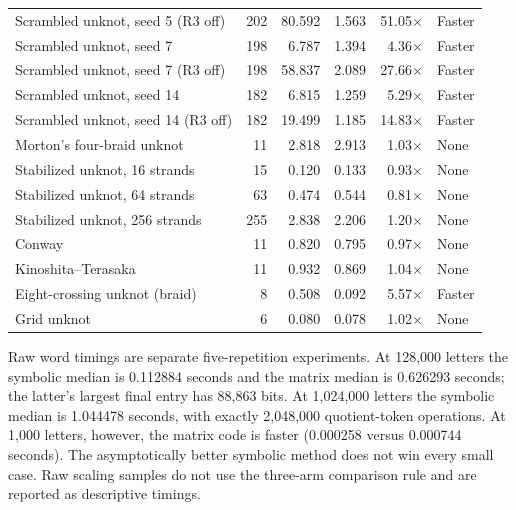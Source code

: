 \begin{longtable}{@{}p{}rrrrl@{}}
Scrambled unknot, seed 5 (R3 off) & 202 & 80.592 & 1.563 & 51.05\(\times\) & Faster \\
Scrambled unknot, seed 7 & 198 & 6.787 & 1.394 & 4.36\(\times\) & Faster \\
Scrambled unknot, seed 7 (R3 off) & 198 & 58.837 & 2.089 & 27.66\(\times\) & Faster \\
Scrambled unknot, seed 14 & 182 & 6.815 & 1.259 & 5.29\(\times\) & Faster \\
Scrambled unknot, seed 14 (R3 off) & 182 & 19.499 & 1.185 & 14.83\(\times\) & Faster \\
Morton's four-braid unknot & 11 & 2.818 & 2.913 & 1.03\(\times\) & None \\
Stabilized unknot, 16 strands & 15 & 0.120 & 0.133 & 0.93\(\times\) & None \\
Stabilized unknot, 64 strands & 63 & 0.474 & 0.544 & 0.81\(\times\) & None \\
Stabilized unknot, 256 strands & 255 & 2.838 & 2.206 & 1.20\(\times\) & None \\
Conway & 11 & 0.820 & 0.795 & 0.97\(\times\) & None \\
Kinoshita--Terasaka & 11 & 0.932 & 0.869 & 1.04\(\times\) & None \\
Eight-crossing unknot (braid) & 8 & 0.508 & 0.092 & 5.57\(\times\) & Faster \\
Grid unknot & 6 & 0.080 & 0.078 & 1.02\(\times\) & None \\
\end{longtable}
\endgroup

Raw word timings are separate five-repetition experiments. At 128,000
letters the symbolic median is 0.112884 seconds and the matrix median
is 0.626293 seconds; the latter's largest final entry has 88,863 bits.
At 1,024,000 letters the symbolic median is 1.044478 seconds, with exactly
2,048,000 quotient-token operations. At 1,000 letters, however, the matrix
code is faster (0.000258 versus 0.000744 seconds). The asymptotically better
symbolic method does not win every small case. Raw scaling samples do not
use the three-arm comparison rule and are reported as descriptive timings.
